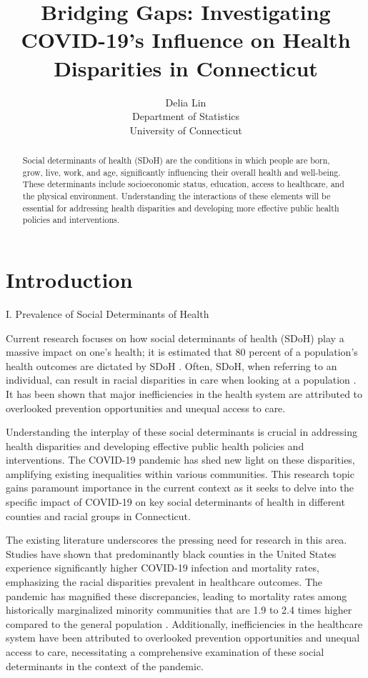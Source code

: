 \documentclass[12pt]{article}
\title{Bridging Gaps: Investigating COVID-19's Influence on Health Disparities in Connecticut}
\author{Delia Lin\\
  Department of Statistics\\
  University of Connecticut
}
\begin{document}
\maketitle

\begin{abstract}
  Social determinants of health (SDoH) are the conditions in which people are born, 
  grow, live, work, and age, significantly influencing their overall health and well-being. 
  These determinants include socioeconomic status, education, access to healthcare, and the 
  physical environment. Understanding the interactions of these elements will be essential for 
  addressing health disparities and developing more effective public health policies and interventions.
\end{abstract}

\section{Introduction}\label{sec:intro}

I. Prevalence of Social Determinants of Health 

Current research focuses on how social determinants of health (SDoH) play a massive
impact on one's health; it is estimated that 80 percent of a population's health outcomes are 
dictated by SDoH 
\citep{HOOD2016129}
. Often, SDoH, when referring to an individual, can result in racial 
disparities in care when looking at a population
\citep{Monroe2023-uq}
. It has been shown that major inefficiencies
in the health system are attributed to overlooked prevention opportunities and unequal access
to care.

Understanding the interplay of these social determinants is crucial in addressing health disparities 
and developing effective public health policies and interventions. The COVID-19 pandemic has shed new light on 
these disparities, amplifying existing inequalities within various communities. This research topic gains paramount 
importance in the current context as it seeks to delve into the specific impact of COVID-19 on key social determinants 
of health in different counties and racial groups in Connecticut.

The existing literature underscores the pressing need for research in this area. Studies have shown that predominantly 
black counties in the United States experience significantly higher COVID-19 infection and mortality rates, emphasizing 
the racial disparities prevalent in healthcare outcomes. The pandemic has magnified these discrepancies, leading to 
mortality rates among historically marginalized minority communities that are 1.9 to 2.4 times higher compared to the 
general population \citep{Badalov2022-wt}. Additionally, inefficiencies in the healthcare system have been attributed 
to overlooked prevention opportunities and unequal access to care, necessitating a comprehensive examination 
of these social determinants in the context of the pandemic.
\end{document}
